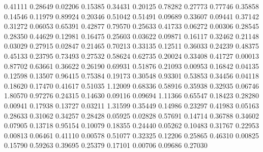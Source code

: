   0.41111 0.28649
  0.02206 0.15385
  0.34431 0.20125
  0.78282 0.27773
  0.77746 0.35858
  0.14546 0.11979
  0.89924 0.20346
  0.51042 0.51491
  0.09689 0.33607
  0.09441 0.37142
  0.31272 0.06053
  0.65391 0.42877
  0.79570 0.25633
  0.41733 0.06272
  0.00306 0.28545
  0.28350 0.44629
  0.12981 0.16475
  0.25603 0.03622
  0.09871 0.16117
  0.32462 0.21148
  0.03029 0.27915
  0.02847 0.21465
  0.70213 0.33135
  0.12511 0.36033
  0.24239 0.48375
  0.45133 0.23795
  0.73493 0.27532
  0.58624 0.62735
  0.20024 0.33408
  0.41727 0.00013
  0.87702 0.63661
  0.36622 0.26190
  0.69931 0.51876
  0.21093 0.00953
  0.16842 0.04135
  0.12598 0.13507
  0.96415 0.75384
  0.19173 0.30548
  0.93301 0.53853
  0.34456 0.04118
  0.18620 0.17470
  0.41617 0.51035
  1.12009 0.68336
  0.58916 0.35938
  0.32935 0.06746
  1.80570 0.97276
  0.24315 0.14630
  0.09116 0.09694
  1.11366 0.65547
  0.18423 0.28280
  0.00941 0.17938
  0.13727 0.03211
  1.31599 0.35449
  0.14986 0.23297
  0.41983 0.05163
  0.28633 0.31062
  0.34257 0.28428
  0.05925 0.02828
  0.57691 0.14714
  0.36788 0.34602
  0.07905 0.13718
  0.95154 0.10079
  0.18355 0.24440
  0.05262 0.10483
  0.31767 0.22953
  0.00813 0.06461
  0.41110 0.00578
  0.51077 0.32325
  0.12206 0.25865
  0.46310 0.00825
  0.15790 0.59263
  0.39695 0.25379
  0.17101 0.00706
  0.09686 0.27030
